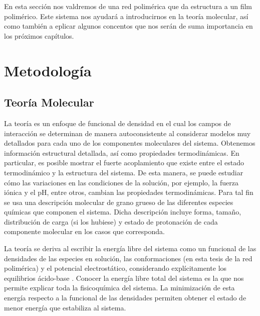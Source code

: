 En esta secci\'on nos valdremos de una  red polim\'erica que da estructura a un film polim\'erico. Este sistema nos ayudar\'a a introducirnos en la teor\'ia molecular, as\'i como tambi\'en a eplicar algunos concentos que nos ser\'an de suma importancia en los pr\'oximos cap\'itulos.



\section{Metodolog\'ia}

\subsection{Teor\'ia Molecular}

La teor\'ia es un enfoque de funcional de densidad en el cual los campos de interacción se determinan de manera autoconsistente al considerar modelos muy detallados para cada uno de los componentes moleculares del sistema. Obtenemos informaci\'on estructural detallada, as\'i como propiedades termodin\'amicas. En particular, es posible mostrar el fuerte acoplamiento que existe entre el estado termodin\'amico y la estructura del sistema. De esta manera, se puede estudiar c\'omo las variaciones en las condiciones de la soluci\'on, por ejemplo, la fuerza i\'onica y el pH, entre otros, cambian las propiedades termodinámicas.
Para tal fin se usa  una descripci\'on molecular de grano grueso de las diferentes especies qu\'imicas que componen el sistema.
Dicha descripci\'on incluye forma, tama\~no, distribuci\'on de carga (si los hubiese) y estado de protonaci\'on de cada componente molecular en los casos que corresponda.

La teor\'ia se deriva al escribir la energ\'ia libre del sistema como un funcional de las densidades de las especies en soluci\'on, las conformaciones (en esta tesis de la red polim\'erica) y el potencial electrost\'atico, considerando expl\'icitamente los equilibrios \'acido-base . 
Conocer la energ\'ia libre total del sistema es la que nos permite explicar toda la fisicoqu\'imica del sistema.  La minimizaci\'on de esta energ\'ia respecto a la funcional de las densidades permiten obtener el estado de menor energ\'ia que estabiliza al sistema.

